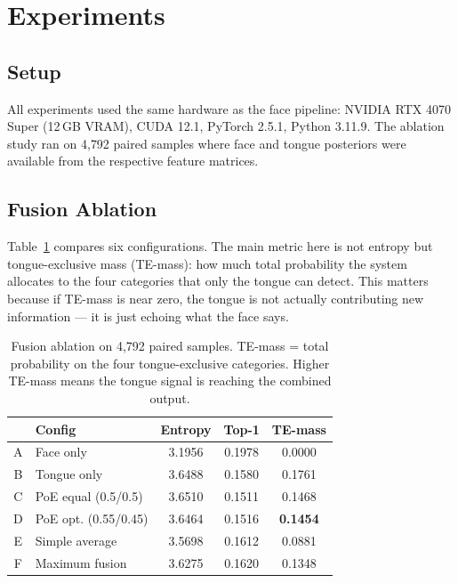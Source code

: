 \documentclass[journal]{IEEEtran}
\begin{document}
\section{Experiments}
\label{sec:experiments}

\subsection{Setup}

All experiments used the same hardware as the face pipeline: NVIDIA RTX 4070
Super (12\,GB VRAM), CUDA 12.1, PyTorch 2.5.1, Python 3.11.9. The ablation
study ran on 4{,}792 paired samples where face and tongue posteriors were
available from the respective feature matrices.

\subsection{Fusion Ablation}
\label{sec:ablation}

Table~\ref{tab:fusion_ablation} compares six configurations. The main metric
here is not entropy but tongue-exclusive mass (TE-mass): how much total probability
the system allocates to the four categories that only the tongue can detect.
This matters because if TE-mass is near zero, the tongue is not actually
contributing new information --- it is just echoing what the face says.

\begin{table}[h]
\centering
\caption{Fusion ablation on 4{,}792 paired samples. TE-mass = total probability
on the four tongue-exclusive categories. Higher TE-mass means the tongue signal
is reaching the combined output.}
\label{tab:fusion_ablation}
\begin{tabular}{clccc}
\toprule
 & \textbf{Config} & \textbf{Entropy} & \textbf{Top-1} & \textbf{TE-mass} \\
\midrule
A & Face only            & 3.1956 & 0.1978 & 0.0000 \\
B & Tongue only          & 3.6488 & 0.1580 & 0.1761 \\
C & PoE equal (0.5/0.5)  & 3.6510 & 0.1511 & 0.1468 \\
D & PoE opt. (0.55/0.45) & 3.6464 & 0.1516 & \textbf{0.1454} \\
E & Simple average        & 3.5698 & 0.1612 & 0.0881 \\
F & Maximum fusion        & 3.6275 & 0.1620 & 0.1348 \\
\bottomrule
\end{tabular}
\end{table}
\end{document}
